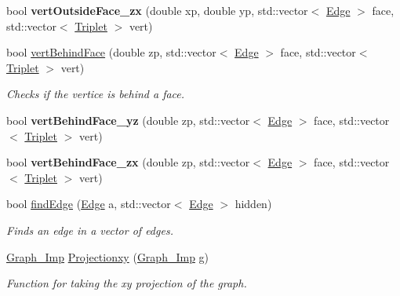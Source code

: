 \begin{DoxyCompactItemize}
\item 
\mbox{\label{class_three___d__to___two___d_ac6a5e575ce173fdbebb19f3791a9413f}} 
bool {\bfseries vert\+Outside\+Face\+\_\+zx} (double xp, double yp, std\+::vector$<$ \mbox{\hyperlink{struct_edge}{Edge}} $>$ face, std\+::vector$<$ \mbox{\hyperlink{struct_triplet}{Triplet}} $>$ vert)
\item 
bool \mbox{\hyperlink{class_three___d__to___two___d_aa791997d3cef025ca3859e28e7ad43b1}{vert\+Behind\+Face}} (double zp, std\+::vector$<$ \mbox{\hyperlink{struct_edge}{Edge}} $>$ face, std\+::vector$<$ \mbox{\hyperlink{struct_triplet}{Triplet}} $>$ vert)
\begin{DoxyCompactList}\small\item\em Checks if the vertice is behind a face. \end{DoxyCompactList}\item 
\mbox{\label{class_three___d__to___two___d_a10ce8d7a3a835b0188ebad2ed6555e11}} 
bool {\bfseries vert\+Behind\+Face\+\_\+yz} (double zp, std\+::vector$<$ \mbox{\hyperlink{struct_edge}{Edge}} $>$ face, std\+::vector$<$ \mbox{\hyperlink{struct_triplet}{Triplet}} $>$ vert)
\item 
\mbox{\label{class_three___d__to___two___d_aa69c0cb9bd4c4b6561edc261570597f0}} 
bool {\bfseries vert\+Behind\+Face\+\_\+zx} (double zp, std\+::vector$<$ \mbox{\hyperlink{struct_edge}{Edge}} $>$ face, std\+::vector$<$ \mbox{\hyperlink{struct_triplet}{Triplet}} $>$ vert)
\item 
bool \mbox{\hyperlink{class_three___d__to___two___d_a925576c935cbabaafa00c1f1e30a600d}{find\+Edge}} (\mbox{\hyperlink{struct_edge}{Edge}} a, std\+::vector$<$ \mbox{\hyperlink{struct_edge}{Edge}} $>$ hidden)
\begin{DoxyCompactList}\small\item\em Finds an edge in a vector of edges. \end{DoxyCompactList}\item 
\mbox{\hyperlink{class_graph___imp}{Graph\+\_\+\+Imp}} \mbox{\hyperlink{class_three___d__to___two___d_a18c70e705fc6f95995c892b0f0b399dd}{Projectionxy}} (\mbox{\hyperlink{class_graph___imp}{Graph\+\_\+\+Imp}} g)
\begin{DoxyCompactList}\small\item\em Function for taking the xy projection of the graph. \end{DoxyCompactList}\item 

\end{DoxyCompactItemize}
